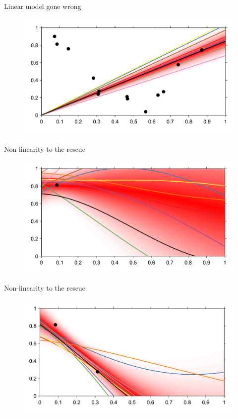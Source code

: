 \documentclass[12pt]{beamer}
\begin{document}
\begin{frame}{Linear model gone wrong}
\begin{figure}
\includegraphics[scale=0.4]{Bayesian_non_linear_14.png} 
\end{figure}
\end{frame}

\begin{frame}{Non-linearity to the rescue}
\begin{figure}
\includegraphics[scale=0.4]{Bayesian_non_linear_15.png} 
\end{figure}
\end{frame}

\begin{frame}{Non-linearity to the rescue}
\begin{figure}
\includegraphics[scale=0.4]{Bayesian_non_linear_16.png} 
\end{figure}
\end{frame}
\end{document}
